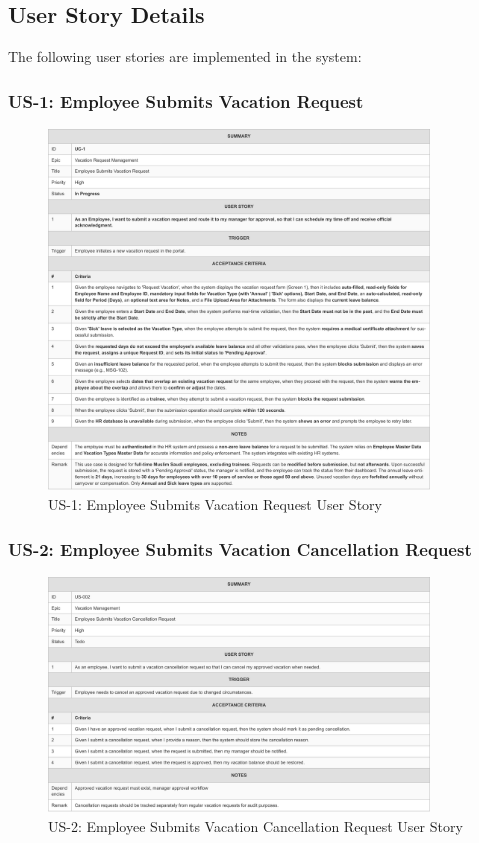 \documentclass[12pt,a4paper]{article}
\begin{document}
\subsection{User Story Details}
The following user stories are implemented in the system:

\subsubsection{US-1: Employee Submits Vacation Request}
\begin{figure}[H]
\centering
\includegraphics[width=0.9\textwidth]{User-Stories/US-1-Employee-Submits-Vacation-Request/US-1-Employee-Submits-Vacation-Request-1.png}
\caption{US-1: Employee Submits Vacation Request User Story}
\label{fig:us1}
\end{figure}

\subsubsection{US-2: Employee Submits Vacation Cancellation Request}
\begin{figure}[H]
\centering
\includegraphics[width=0.9\textwidth]{User-Stories/US-2-Employee-Submits-Vacation-Cancellation-Request/US-2-Employee-Submits-Vacation-Cancellation-Request-1.png}
\caption{US-2: Employee Submits Vacation Cancellation Request User Story}
\label{fig:us2}
\end{figure}
\end{document}
